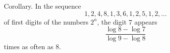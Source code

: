 Corollary. In the sequence
$$1, 2, 4, 8, 1, 3, 6, 1, 2, 5, 1, 2, \ldots$$
of first digits of the numbers $2^n$, the digit $7$ appears
$$\frac{\log 8 - \log 7}{\log 9 - \log 8}$$
times as often as $8$.
